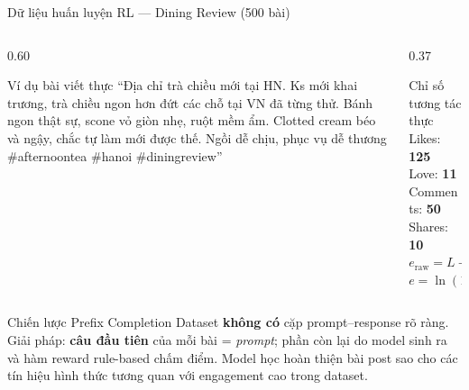 \begin{frame}[t]{Dữ liệu huấn luyện RL --- Dining Review (500 bài)}
  \begin{columns}[T,onlytextwidth]
    \begin{column}{0.60\textwidth}
      \begin{block}{Ví dụ bài viết thực}
        \scriptsize
        ``Địa chỉ trà chiều mới tại HN. Ks mới khai trương,
        trà chiều ngon hơn đứt các chỗ tại VN đã từng thử.
        Bánh ngon thật sự, scone vỏ giòn nhẹ, ruột mềm ẩm.
        Clotted cream béo và ngậy, chắc tự làm mới được thế.
        Ngồi dễ chịu, phục vụ dễ thương
        \#afternoontea \#hanoi \#diningreview''
      \end{block}
    \end{column}
    \begin{column}{0.37\textwidth}
      \begin{block}{Chỉ số tương tác thực}
        \scriptsize
        Likes: \textbf{125} \quad Love: \textbf{11}\\
        Comments: \textbf{50}\\
        Shares: \textbf{10}\\[0.4em]
        $e_{\text{raw}} = L + 0{,}5C + 1{,}5S + \ldots$\\
        $e = \ln(1 + e_{\text{raw}}) = \mathbf{5{,}68}$
      \end{block}
    \end{column}
  \end{columns}
  \vspace{0.5em}
  \begin{block}{Chiến lược Prefix Completion}
    \scriptsize
    Dataset \textbf{không có} cặp prompt--response rõ ràng.
    Giải pháp: \textbf{câu đầu tiên} của mỗi bài = \emph{prompt};
    phần còn lại do model sinh ra và hàm reward rule-based chấm điểm.
    Model học hoàn thiện bài post sao cho các tín hiệu hình thức
    tương quan với engagement cao trong dataset.
  \end{block}
\end{frame}

